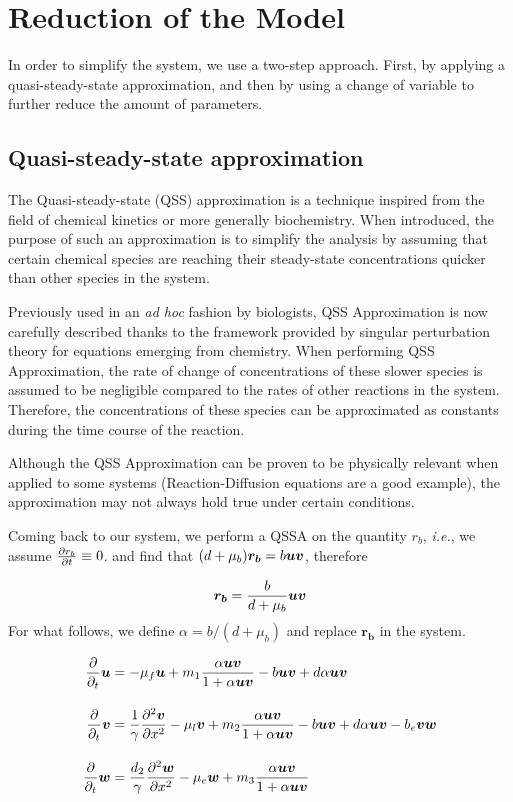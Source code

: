 \section{Reduction of the Model}

In order to simplify the system, we use a two-step approach. First, by applying a quasi-steady-state approximation, and then by using a change of variable to further reduce the amount of parameters. 

\subsection{Quasi-steady-state approximation}

The Quasi-steady-state (QSS) approximation is a  technique inspired from the field of  chemical kinetics or more generally biochemistry. When introduced, the purpose of such an approximation is to simplify the analysis by assuming that certain chemical species are reaching their steady-state concentrations quicker than other species in the system.

Previously used in an \textit{ad hoc} fashion by biologists, QSS Approximation is now carefully described thanks to the framework provided by singular perturbation theory for equations emerging from chemistry.
When performing QSS Approximation, the rate of change of concentrations of these slower species is assumed to be negligible compared to the rates of other reactions in the system. Therefore, the concentrations of these species can be approximated as constants during the time course of the reaction.

\begin{remark}
Although the QSS Approximation can be proven to be physically relevant when applied to some systems (Reaction-Diffusion equations are a good example), the approximation may not always hold true under certain conditions.
\end{remark}

Coming back to our system, we perform a QSSA on the quantity $r_b$, \textit{i.e.}, we assume $\frac{\partial r_b}{\partial t} \equiv 0$. and find that $(d + \mu_b)\bm{r_b} = b \bm{u} \bm{v} $, therefore

$$\bm{r_b} = \dfrac{b}{d + \mu_b} \bm{u} \bm{v}$$
For what follows, we define $\alpha = b / (d + \mu_b)$ and replace $\bm{r_b}$ in the system.

\begin{align}
    \dfrac{\partial}{\partial_t} \bm{u} &= -\mu_f \bm{u} + m_1 \dfrac{\alpha \bm{u} \bm{v}}{1 + \alpha \bm{u} \bm{v}} - b \bm{u} \bm{v} + d \alpha \bm{u} \bm{v} \notag \\[1em]
    \dfrac{\partial}{\partial_t} \bm{v} &= \dfrac{1}{\gamma} \frac{\partial^2 \bm{v}}{\partial x^2} - \mu_l \bm{v} + m_2 \dfrac{\alpha \bm{u} \bm{v}}{1 + \alpha \bm{u}\bm{v}} - b \bm{u} \bm{v} + d \alpha \bm{u} \bm{v} - b_e \bm{v}\bm{w}  \\[1em]
    \dfrac{\partial}{\partial_t} \bm{w} &= \dfrac{d_2}{\gamma} \frac{\partial^2 \bm{w}}{\partial x^2} - \mu_e \bm{w} + m_3 \dfrac{\alpha\bm{u}\bm{v}}{1 + \alpha\bm{u}\bm{v}} \notag
\end{align}

